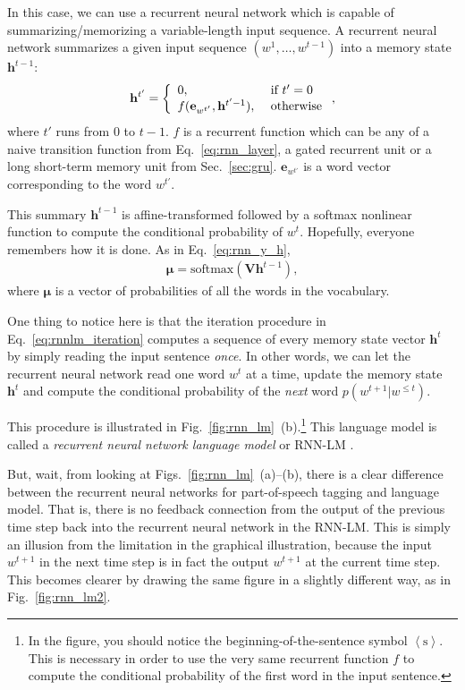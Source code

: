 \documentclass{report}
\newcommand{\softmax}{\text{softmax}}
\newcommand{\vect}[1]{\mathbf{#1}}
\newcommand{\vects}[1]{\boldsymbol{#1}}
\newcommand{\matr}[1]{\mathbf{#1}}
\newcommand{\ve}[0]{\vect{e}}
\newcommand{\vh}[0]{\vect{h}}
\newcommand{\mV}[0]{\matr{V}}
\newcommand{\vmu}[0]{\vects{\mu}}
\begin{document}
In this case, we can use a recurrent neural network which is capable of
summarizing/memorizing a variable-length input sequence.  A recurrent neural
network summarizes a given input sequence $(w^1, \ldots, w^{t-1})$ into a memory
state $\vh^{t-1}$:
\begin{align}
    \label{eq:rnnlm_iteration}
    \vh^{t'} = \left\{
        \begin{array}{l l}
            0,&\text{ if }t'=0 \\
            f(\ve_{w^{t'}}, \vh^{t'-1}),&\text{ otherwise}
        \end{array}
        \right.,
\end{align}
where $t'$ runs from $0$ to $t-1$.  $f$ is a recurrent function which can be any
of a naive transition function from Eq.~\eqref{eq:rnn_layer}, a gated recurrent
unit or a long short-term memory unit from Sec.~\ref{sec:gru}. $\ve_{w^{t'}}$ is
a word vector corresponding to the word $w^{t'}$.

This summary $\vh^{t-1}$ is affine-transformed followed by a softmax nonlinear
function to compute the conditional probability of $w^t$. Hopefully, everyone
remembers how it is done. As in Eq.~\eqref{eq:rnn_y_h}, 
\begin{align*}
    \vmu = \softmax(\mV \vh^{t-1}),
\end{align*}
where $\vmu$ is a vector of probabilities of all the words in the vocabulary.

One thing to notice here is that the iteration procedure in
Eq.~\eqref{eq:rnnlm_iteration} computes a sequence of every memory state vector
$\vh^t$ by simply reading the input sentence {\em once}. In other words, we can
let the recurrent neural network read one word $w^t$ at a time, update the
memory state $\vh^t$ and compute the conditional probability of the {\em next}
word $p(w^{t+1}|w^{\leq t})$. 

This procedure is illustrated in Fig.~\ref{fig:rnn_lm}~(b).\footnote{
    In the figure, you should notice the beginning-of-the-sentence symbol
    $\left< \text{s} \right>$. This is necessary in order to use the very same
    recurrent function $f$ to compute the conditional probability of the first
    word in the input sentence.
}
This language model is called a {\em recurrent neural network language
model} or RNN-LM \citep{mikolov2010recurrent}.

But, wait, from looking at Figs.~\ref{fig:rnn_lm}~(a)--(b), there is a clear
difference between the recurrent neural networks for part-of-speech tagging and
language model. That is, there is no feedback connection from the output of the
previous time step back into the recurrent neural network in the RNN-LM.  This
is simply an illusion from the limitation in the graphical illustration, because
the input $w^{t+1}$ in the next time step is in fact the output $w^{t+1}$ at the
current time step. This becomes clearer by drawing the same figure in a slightly
different way, as in Fig.~\ref{fig:rnn_lm2}.
\end{document}
